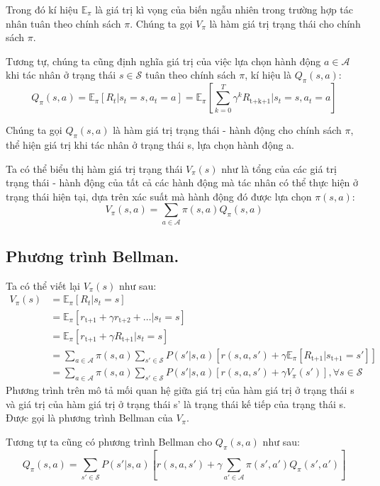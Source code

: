 \documentclass{uetgraduation}
\begin{document}
Trong đó kí hiệu $\mathbb{E}_\pi$ là giá trị kì vọng của biến ngẫu nhiên trong trường hợp tác nhân tuân theo chính sách $\pi$. Chúng ta gọi $V_\pi$ là hàm giá trị trạng thái cho chính sách $\pi$.

Tương tự, chúng ta cũng định nghĩa giá trị của việc lựa chọn hành động $a \in \mathcal{A}$ khi tác nhân ở trạng thái $s \in \mathcal{S}$ tuân theo chính sách $\pi$, kí hiệu là $Q_\pi (s, a)$:
\[
Q_\pi (s, a) = \mathbb{E}_\pi [R_t | s_t = s, a_t = a] = \mathbb{E}_\pi [\sum_{k=0}^{T} \gamma^k R_\text{t+k+1} | s_t = s, a_t = a]
\]

Chúng ta gọi $Q_\pi (s, a)$ là hàm giá trị trạng thái - hành động cho chính sách $\pi$, thể hiện giá trị khi tác nhân ở trạng thái s, lựa chọn hành động a.

Ta có thể biểu thị hàm giá trị trạng thái $V_\pi (s)$ như là tổng của các giá trị trạng thái - hành động của tất cả các hành động mà tác nhân có thể thực hiện ở trạng thái hiện tại, dựa trên xác suất
mà hành động đó được lựa chọn $\pi(s, a)$:
\[
V_\pi (s, a) = \sum_{a \in \mathcal{A}} \pi(s, a) Q_\pi (s, a)
\]

\subsection{Phương trình Bellman.}
Ta có thể viết lại $V_\pi(s)$ như sau:
\begin{align*}
    V_\pi(s) &= \mathbb{E}_\pi [R_t | s_t = s] \\
    &= \mathbb{E}_\pi [r_\text{t+1} + \gamma r_\text{t+2} + \dots | s_t = s] \\
    &= \mathbb{E}_\pi [r_\text{t+1} + \gamma R_\text{t+1} | s_t = s] \\
    &= \sum_{a \in \mathcal{A}} \pi (s, a) \sum_{s' \in \mathcal{S}} P(s' | s, a) [r(s, a, s') + \gamma \mathbb{E}_\pi [R_\text{t+1} | s_\text{t+1} = s']] \\
    &= \sum_{a \in \mathcal{A}} \pi (s, a) \sum_{s' \in \mathcal{S}} P(s' | s, a) [r(s, a, s') + \gamma V_\pi (s')], \forall s \in \mathcal{S}
\end{align*}
Phương trình trên mô tả mối quan hệ giữa giá trị của hàm giá trị ở trạng thái s và giá trị của hàm giá trị ở trạng thái s' là trạng thái kế tiếp của trạng thái s. Được gọi là phương trình Bellman
của $V_\pi$.

Tương tự ta cũng có phương trình Bellman cho $Q_\pi(s, a)$ như sau:
\[
Q_\pi(s, a) = \sum_{s' \in \mathcal{S}} P(s' | s, a) [r(s, a, s') + \gamma \sum_{a' \in \mathcal{A}} \pi(s', a') Q_\pi(s', a')]
\]
\end{document}
